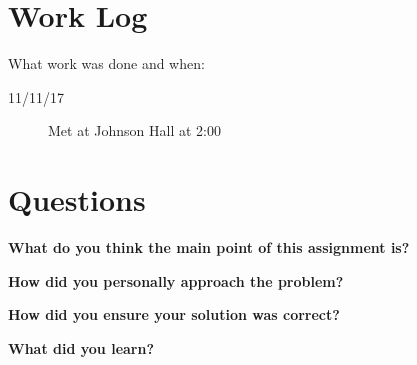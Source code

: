\documentclass[10pt,letterpaper,draftclsnofoot,onecolumn]{IEEEtran}
\begin{document}
\section{Work Log}
\noindent What work was done and when:
\begin{description}
\item [11/11/17] Met at Johnson Hall at 2:00

\end{description}

\section{Questions}

\noindent\textbf{What do you think the main point of this assignment is?}

\indent{}

\noindent\textbf{How did you personally approach the problem?}

\indent{}

\noindent\textbf{How did you ensure your solution was correct?}

\indent{}

\noindent\textbf{What did you learn?}

\indent{}
\end{document}
